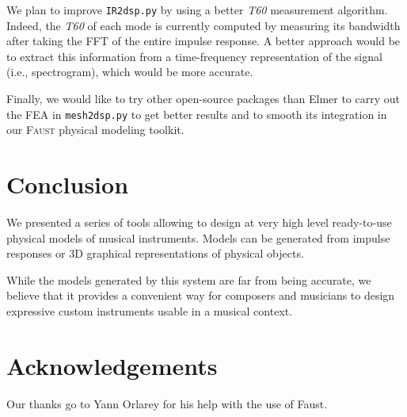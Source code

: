 \documentclass[11pt,a4paper]{article}
\newcommand{\f}{\textsc{Faust}}
\begin{document}
We plan to improve \texttt{IR2dsp.py} by using a better \textit{T60} measurement algorithm. Indeed, the \textit{T60} of each mode is currently computed by measuring its bandwidth after taking the FFT of the entire impulse response. A better approach would be to extract this information from a time-frequency representation of the signal (i.e., spectrogram), which would be more accurate.

Finally, we would like to try other open-source packages than Elmer to carry out the FEA in \texttt{mesh2dsp.py} to get better results and to smooth its integration in our \f{} physical modeling toolkit.  

\section{Conclusion}

We presented a series of tools allowing to design at very high level ready-to-use physical models of musical instruments. Models can be generated from impulse responses or 3D graphical representations of physical objects.

While the models generated by this system are far from being accurate, we believe that it provides a convenient way for composers and musicians to design expressive custom instruments usable in a musical context.  


\section{Acknowledgements}

Our thanks go to Yann Orlarey for his help with the use of Faust.



\end{document}
